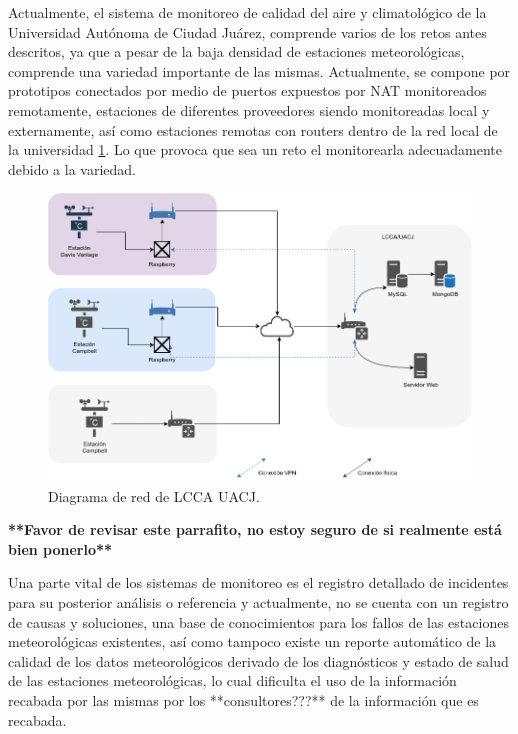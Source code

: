 

Actualmente, el sistema de monitoreo de calidad del aire y climatológico de la Universidad Autónoma de Ciudad Juárez, comprende varios de los retos antes descritos, ya que a pesar de la baja densidad de estaciones meteorológicas, comprende una variedad importante de las mismas. Actualmente, se compone por prototipos conectados por medio de puertos expuestos por NAT monitoreados remotamente\cite{red_climatologica_uacj}, estaciones de diferentes proveedores siendo monitoreadas local y externamente, así como estaciones remotas con routers dentro de la red local de la universidad \ref{fig:current_network}. Lo que provoca que sea un reto el monitorearla adecuadamente debido a la variedad.

\begin{figure}[!ht]
	\centering
	\includegraphics[width=.80\linewidth]{images/diagrams/current_network.png}
	\caption{Diagrama de red de LCCA UACJ.}
	\label{fig:current_network}
\end{figure}

\textbf{**Favor de revisar este parrafito, no estoy seguro de si realmente está bien ponerlo**}

Una parte vital de los sistemas de monitoreo es el registro detallado de incidentes para su posterior análisis o referencia y actualmente, no se cuenta con un registro de causas y soluciones, una base de conocimientos para los fallos de las estaciones meteorológicas existentes, así como tampoco existe un reporte automático de la calidad de los datos meteorológicos derivado de los diagnósticos y estado de salud de las estaciones meteorológicas, lo cual dificulta el uso de la información recabada por las mismas por los **consultores???** de la información que es recabada.


